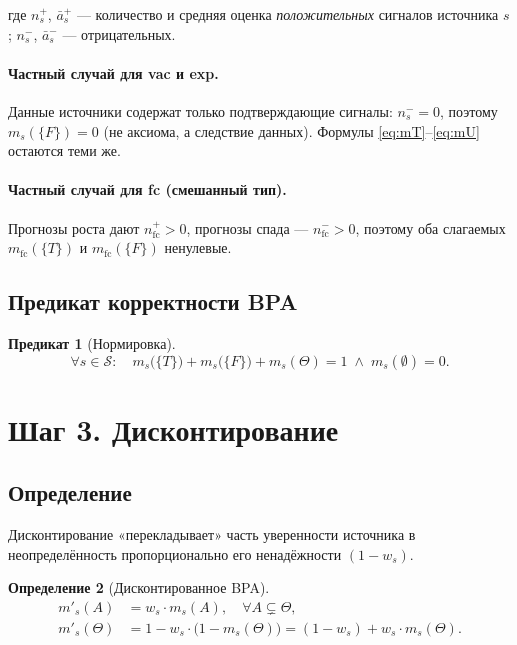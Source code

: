 \documentclass[12pt,a4paper]{article}
\newtheorem{definition}{Определение}
\newtheorem{predicate}[definition]{Предикат}
\begin{document}
где $n_s^{+}$, $\bar{a}_s^{+}$ --- количество и средняя оценка
\emph{положительных} сигналов источника $s$;
$n_s^{-}$, $\bar{a}_s^{-}$ --- отрицательных.

\paragraph{Частный случай для vac и exp.}
Данные источники содержат только подтверждающие сигналы:
$n_s^{-} = 0$, поэтому $m_s(\{F\}) = 0$ (не аксиома, а следствие данных).
Формулы \eqref{eq:mT}--\eqref{eq:mU} остаются теми же.

\paragraph{Частный случай для fc (смешанный тип).}
Прогнозы роста дают $n_{\mathrm{fc}}^{+} > 0$, прогнозы спада ---
$n_{\mathrm{fc}}^{-} > 0$, поэтому оба слагаемых $m_{\mathrm{fc}}(\{T\})$
и $m_{\mathrm{fc}}(\{F\})$ ненулевые.

\subsection{Предикат корректности BPA}

\begin{predicate}[Нормировка]
  \[
    \forall s \in \mathcal{S}:\quad
    m_s\!\bigl(\{T\}\bigr) + m_s\!\bigl(\{F\}\bigr) + m_s(\Theta) = 1
    \;\wedge\;
    m_s(\emptyset) = 0.
  \]
\end{predicate}

\section{Шаг 3. Дисконтирование}

\subsection{Определение}

Дисконтирование «перекладывает» часть уверенности источника
в неопределённость пропорционально его ненадёжности $(1 - w_s)$.

\begin{definition}[Дисконтированное BPA]
  \begin{align}
    m'_s(A)      &= w_s \cdot m_s(A),
      \quad \forall A \subsetneq \Theta,
      \label{eq:disc_A} \\[6pt]
    m'_s(\Theta) &= 1 - w_s \cdot \bigl(1 - m_s(\Theta)\bigr)
                 = (1 - w_s) + w_s \cdot m_s(\Theta).
      \label{eq:disc_Theta}
  \end{align}
\end{definition}
\end{document}
